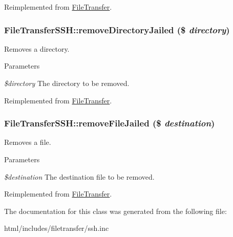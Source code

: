 Reimplemented from \hyperlink{classFileTransfer_a0522f0f47d022f2cf8fe375b983d4e39}{FileTransfer}.\hypertarget{classFileTransferSSH_a9b476fade233e689a0422593c961c0bb}{
\subsubsection[{removeDirectoryJailed}]{\setlength{\rightskip}{0pt plus 5cm}FileTransferSSH::removeDirectoryJailed (\$ {\em directory})}}
\label{classFileTransferSSH_a9b476fade233e689a0422593c961c0bb}
Removes a directory.


\begin{DoxyParams}{Parameters}
\item[{\em \$directory}]The directory to be removed. \end{DoxyParams}


Reimplemented from \hyperlink{classFileTransfer_a9b9a21556d191235b3a5f85c15878789}{FileTransfer}.\hypertarget{classFileTransferSSH_aac364593d01d77780e3b22d76c778872}{
\subsubsection[{removeFileJailed}]{\setlength{\rightskip}{0pt plus 5cm}FileTransferSSH::removeFileJailed (\$ {\em destination})}}
\label{classFileTransferSSH_aac364593d01d77780e3b22d76c778872}
Removes a file.


\begin{DoxyParams}{Parameters}
\item[{\em \$destination}]The destination file to be removed. \end{DoxyParams}


Reimplemented from \hyperlink{classFileTransfer_aa699cbea5def346f1d5ce818b0fa7ea7}{FileTransfer}.

The documentation for this class was generated from the following file:\begin{DoxyCompactItemize}
\item 
html/includes/filetransfer/ssh.inc\end{DoxyCompactItemize}
